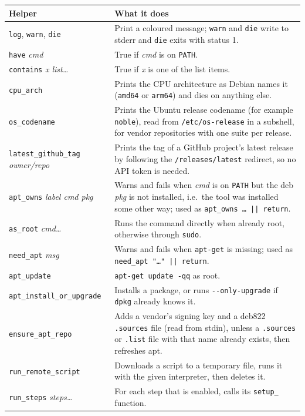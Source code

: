 \documentclass[11pt,a4paper]{article}
\newcommand{\cmd}[1]{\texttt{#1}}
\begin{document}
\begin{center}
\begin{tabularx}{\linewidth}{@{}lX@{}}
\toprule
Helper & What it does \\
\midrule
\cmd{log}, \cmd{warn}, \cmd{die} & Print a coloured message; \cmd{warn} and \cmd{die} write to stderr and \cmd{die} exits with status 1. \\
\cmd{have} \textit{cmd} & True if \textit{cmd} is on \cmd{PATH}. \\
\cmd{contains} \textit{x list\ldots} & True if \textit{x} is one of the list items. \\
\cmd{cpu\_arch} & Prints the CPU architecture as Debian names it (\cmd{amd64} or \cmd{arm64}) and dies on anything else. \\
\cmd{os\_codename} & Prints the Ubuntu release codename (for example \cmd{noble}), read from \cmd{/etc/os-release} in a subshell, for vendor repositories with one suite per release. \\
\cmd{latest\_github\_tag} \textit{owner/repo} & Prints the tag of a GitHub project's latest release by following the \cmd{/releases/latest} redirect, so no API token is needed. \\
\cmd{apt\_owns} \textit{label cmd pkg} & Warns and fails when \textit{cmd} is on \cmd{PATH} but the deb \textit{pkg} is not installed, i.e.\ the tool was installed some other way; used as \cmd{apt\_owns \ldots{} || return}. \\
\cmd{as\_root} \textit{cmd\ldots} & Runs the command directly when already root, otherwise through \cmd{sudo}. \\
\cmd{need\_apt} \textit{msg} & Warns and fails when \cmd{apt-get} is missing; used as \cmd{need\_apt "\ldots" || return}. \\
\cmd{apt\_update} & \cmd{apt-get update -qq} as root. \\
\cmd{apt\_install\_or\_upgrade} & Installs a package, or runs \cmd{-{}-only-upgrade} if \cmd{dpkg} already knows it. \\
\cmd{ensure\_apt\_repo} & Adds a vendor's signing key and a deb822 \cmd{.sources} file (read from stdin), unless a \cmd{.sources} or \cmd{.list} file with that name already exists, then refreshes apt. \\
\cmd{run\_remote\_script} & Downloads a script to a temporary file, runs it with the given interpreter, then deletes it. \\
\cmd{run\_steps} \textit{steps\ldots} & For each step that is enabled, calls its \cmd{setup\_} function. \\
\bottomrule
\end{tabularx}
\end{center}
\end{document}
